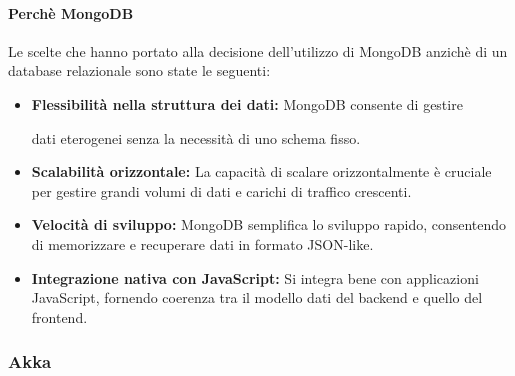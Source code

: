 \paragraph{Perchè MongoDB}

Le scelte che hanno portato alla decisione dell'utilizzo di MongoDB anzichè
di un database relazionale sono state le seguenti:

\begin{itemize}
      \item \textbf{Flessibilità nella struttura dei dati:} MongoDB consente di gestire

            dati eterogenei senza la necessità di uno schema fisso.

      \item \textbf{Scalabilità orizzontale:} La capacità di scalare orizzontalmente è
            cruciale per gestire grandi volumi di dati e carichi di traffico crescenti.

      \item \textbf{Velocità di sviluppo:} MongoDB semplifica lo sviluppo rapido,
            consentendo di memorizzare e recuperare dati in formato JSON-like.

      \item \textbf{Integrazione nativa con JavaScript:} Si integra bene con applicazioni
            JavaScript, fornendo coerenza tra il modello dati del backend e quello del frontend.
\end{itemize}

\subsubsection{Akka}









